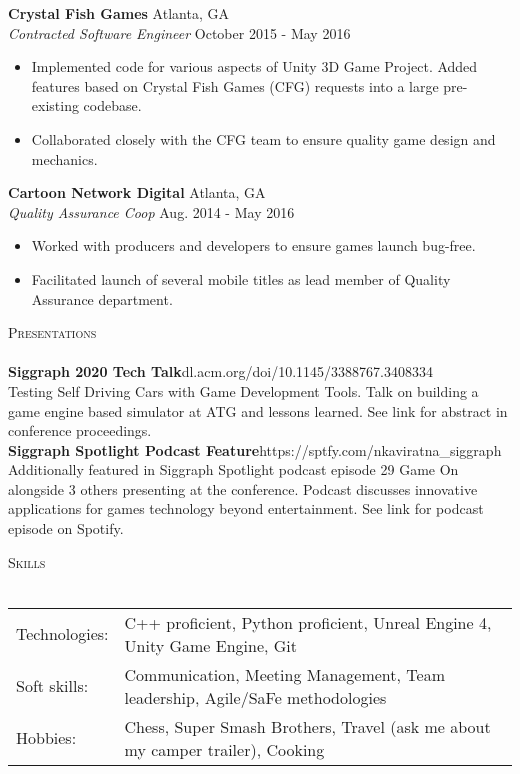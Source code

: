 \documentclass[a4paper]{article}
\newcommand{\lineunder} {
    \vspace*{-8pt} \\
    \hspace*{-18pt} \hrulefill \\
}
\newcommand{\header} [1] {
    {\hspace*{-18pt}\vspace*{6pt} \textsc{#1}}
    \vspace*{-6pt} \lineunder
}
\begin{document}
\textbf{Crystal Fish Games} \hfill Atlanta, GA\\
\textit{Contracted Software Engineer} \hfill October 2015 - May 2016\\
\vspace{-1mm}
\begin{itemize} \itemsep 1pt
	\item Implemented code for various aspects of Unity 3D Game Project. Added features based on Crystal Fish Games (CFG) requests into a large pre-existing codebase.
	\item Collaborated closely with the CFG team to ensure quality game design and mechanics.
\end{itemize}
\textbf{Cartoon Network Digital} \hfill Atlanta, GA\\
\textit{Quality Assurance Coop} \hfill Aug. 2014 - May 2016\\
\vspace{-1mm}
\begin{itemize} \itemsep 1pt
	\item Worked with producers and developers to ensure games launch bug-free.
	\item Facilitated launch of several mobile titles as lead member of Quality Assurance department.
\end{itemize}

\header{Presentations}
{\textbf{Siggraph 2020 Tech Talk}}\hfill dl.acm.org/doi/10.1145/3388767.3408334\\
\textquotedbl{}Testing Self Driving Cars with Game Development Tools\textquotedbl{}. Talk on building a game engine based simulator at ATG and lessons learned. See link for abstract in conference proceedings.\\
\vspace*{2mm}
{\textbf{Siggraph Spotlight Podcast Feature}}\hfill https://sptfy.com/nkaviratna\_siggraph\\
Additionally featured in Siggraph Spotlight podcast episode 29 \textquotedbl{}Game On\textquotedbl{} alongside 3 others presenting at the conference. Podcast discusses innovative applications for games technology beyond entertainment. See link for podcast episode on Spotify.\\
\vspace*{2mm}

\header{Skills}
\begin{tabular}{ l l }
	Technologies: & C++ proficient, Python proficient, Unreal Engine 4, Unity Game Engine, Git    \\
	Soft skills:  & Communication, Meeting Management, Team leadership, Agile/SaFe methodologies  \\
	Hobbies:      & Chess, Super Smash Brothers, Travel (ask me about my camper trailer), Cooking \\
\end{tabular}
\vspace{2mm}
\end{document}
